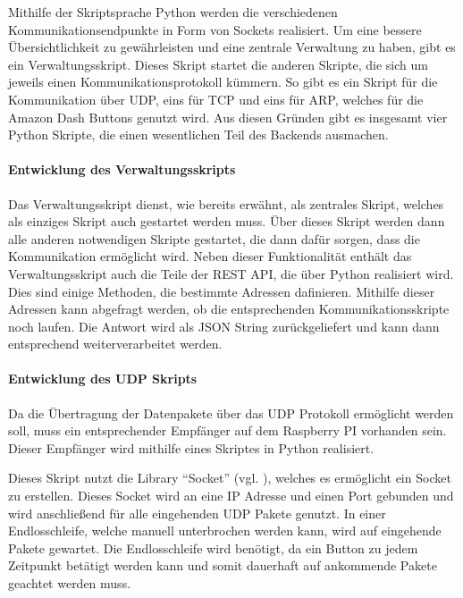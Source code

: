 Mithilfe der Skriptsprache Python werden die verschiedenen Kommunikationsendpunkte in Form von Sockets realisiert. Um eine bessere Übersichtlichkeit zu gewährleisten und eine zentrale Verwaltung zu haben, gibt es ein Verwaltungsskript. Dieses Skript startet die anderen Skripte, die sich um jeweils einen Kommunikationsprotokoll kümmern. So gibt es ein Skript für die Kommunikation über \ac{UDP}, eins für \ac{TCP} und eins für \ac{ARP}, welches für die Amazon Dash Buttons genutzt wird. Aus diesen Gründen gibt es insgesamt vier Python Skripte, die einen wesentlichen Teil des Backends ausmachen.

\paragraph{Entwicklung des Verwaltungsskripts}$\;$ \\  
\label{sec:Entwicklung des Verwaltungsskripts-1} 
Das Verwaltungsskript dienst, wie bereits erwähnt, als zentrales Skript, welches als einziges Skript auch gestartet werden muss. Über dieses Skript werden dann alle anderen notwendigen Skripte gestartet, die dann dafür sorgen, dass die Kommunikation ermöglicht wird. Neben dieser Funktionalität enthält das Verwaltungsskript auch die Teile der \ac{REST} \ac{API}, die über Python realisiert wird. Dies sind einige Methoden, die bestimmte Adressen dafinieren. Mithilfe dieser Adressen kann abgefragt werden, ob die entsprechenden Kommunikationsskripte noch laufen. Die Antwort wird als \ac{JSON} String zurückgeliefert und kann dann entsprechend weiterverarbeitet werden. 

\paragraph{Entwicklung des UDP Skripts}$\;$ \\  
\label{sec:Entwicklung des UDP Skripts-1} 
Da die Übertragung der Datenpakete über das \ac{UDP} Protokoll ermöglicht werden soll, muss ein entsprechender Empfänger auf dem Raspberry PI vorhanden sein. Dieser Empfänger wird mithilfe eines Skriptes in Python realisiert.

Dieses Skript nutzt die Library ``Socket'' (vgl. \cite{.20.02.2017}), welches es ermöglicht ein Socket zu erstellen. Dieses Socket wird an eine \ac{IP} Adresse und einen Port gebunden und wird anschließend für alle eingehenden \ac{UDP} Pakete genutzt. In einer Endlosschleife, welche manuell unterbrochen werden kann, wird auf eingehende Pakete gewartet. Die Endlosschleife wird benötigt, da ein Button zu jedem Zeitpunkt betätigt werden kann und somit dauerhaft auf ankommende Pakete geachtet werden muss. 

